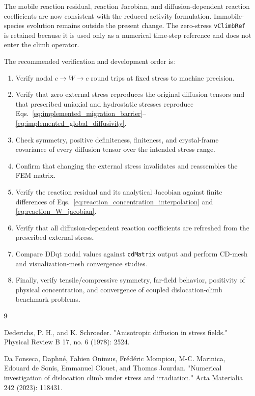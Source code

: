 \documentclass[10pt]{article}
\begin{document}
The mobile reaction residual, reaction Jacobian, and diffusion-dependent
reaction coefficients are now consistent with the reduced activity
formulation.  Immobile-species evolution remains outside the present change.
The zero-stress \texttt{vClimbRef} is retained because it is used only as a
numerical time-step reference and does not enter the climb operator.

The recommended verification and development order is:
\begin{enumerate}
    \item Verify nodal $c\rightarrow W\rightarrow c$ round trips at fixed
    stress to machine precision.
    \item Verify that zero external stress reproduces the original diffusion
    tensors and that prescribed uniaxial and hydrostatic stresses reproduce
    Eqs.~\eqref{eq:implemented_migration_barrier}--\eqref{eq:implemented_global_diffusivity}.
    \item Check symmetry, positive definiteness, finiteness, and crystal-frame
    covariance of every diffusion tensor over the intended stress range.
    \item Confirm that changing the external stress invalidates and
    reassembles the FEM matrix.
    \item Verify the reaction residual and its analytical Jacobian against
    finite differences of Eqs.~\eqref{eq:reaction_concentration_interpolation}
    and \eqref{eq:reaction_W_jacobian}.
    \item Verify that all diffusion-dependent reaction coefficients are
    refreshed from the prescribed external stress.
    \item Compare DDqt nodal values against \texttt{cdMatrix} output and
    perform CD-mesh and visualization-mesh convergence studies.
    \item Finally, verify tensile/compressive symmetry, far-field behavior,
    positivity of physical concentration, and convergence of coupled
    dislocation-climb benchmark problems.
\end{enumerate}

\begin{thebibliography}{9}

Dederichs, P. H., and K. Schroeder. "Anisotropic diffusion in stress fields." Physical Review B 17, no. 6 (1978): 2524.

  Da Fonseca, Daphné, Fabien Onimus, Frédéric Mompiou, M-C. Marinica, Edouard de Sonis, Emmanuel Clouet, and Thomas Jourdan. "Numerical investigation of dislocation climb under stress and irradiation." Acta Materialia 242 (2023): 118431.
  
\end{thebibliography}
\end{document}
